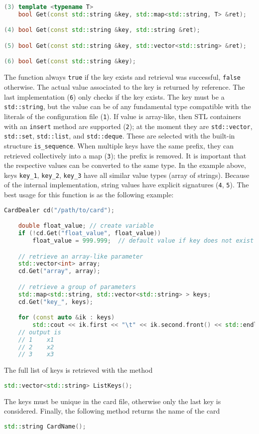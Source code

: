 \documentclass[a4paper, 11pt]{article}
\begin{document}
\begin{lstlisting}[language=C++]
(3) template <typename T>
    bool Get(const std::string &key, std::map<std::string, T> &ret);

(4) bool Get(const std::string &key, std::string &ret);

(5) bool Get(const std::string &key, std::vector<std::string> &ret);

(6) bool Get(const std::string &key);
\end{lstlisting}
The function always \texttt{true} if the key exists and retrieval was successful, \texttt{false} otherwise.
The actual value associated to the key is returned by reference.
The last implementation (\texttt{6}) only checks if the key exists.
The key must be a \texttt{std::string}, but the value can be of any fundamental type compatible with the literals of the configuration file (\texttt{1}).
If value is array-like, then STL containers with an \texttt{insert} method are supported (\texttt{2}); %
at the moment they are \texttt{std::vector},  \texttt{std::set},  \texttt{std::list},  and \texttt{std::deque}. 
These are selected with the built-in structure \texttt{is\_sequence}.
When multiple keys have the same prefix, they can retrieved collectively into a map (\texttt{3}); the prefix is removed.
It is important that the respective values can be converted to the same type.
In the example above, keys \texttt{key\_1}, \texttt{key\_2}, \texttt{key\_3} have all similar value types (array of strings).
Because of the internal implementation, string values have explicit signatures (\texttt{4}, \texttt{5}).
The best usage for this function is as the following example:
\begin{lstlisting}[language=C++]
	CardDealer cd("/path/to/card");

	double float_value; // create variable
	if (!cd.Get("float_value", float_value))
		float_value = 999.999;	// default value if key does not exist

	// retrieve an array-like parameter
	std::vector<int> array;
	cd.Get("array", array);

	// retrieve a group of parameters
	std::map<std::string, std::vector<std::string> > keys;
	cd.Get("key_", keys);

	for (const auto &ik : keys)
		std::cout << ik.first << "\t" << ik.second.front() << std::endl;
	// output is
	// 1	x1
	// 2	x2
	// 3	x3
\end{lstlisting}

The full list of keys is retrieved with the method
\begin{lstlisting}[language=C++]
    std::vector<std::string> ListKeys();
\end{lstlisting}
The keys must be unique in the card file, otherwise only the last key is considered.
Finally, the following method returns the name of the card
\begin{lstlisting}[language=C++]
    std::string CardName();
\end{lstlisting}
\end{document}

